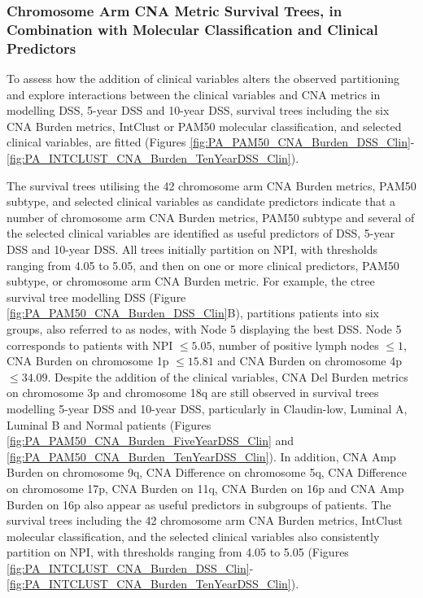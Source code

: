 \subsubsection{Chromosome Arm CNA Metric Survival Trees, in Combination with Molecular Classification and Clinical Predictors} 
To assess how the addition of clinical variables alters the observed partitioning and explore interactions between the clinical variables and CNA metrics in modelling DSS, 5-year DSS and 10-year DSS, survival trees including the six CNA Burden metrics, IntClust or PAM50 molecular classification, and selected clinical variables, are fitted (Figures \ref{fig:PA_PAM50_CNA_Burden_DSS_Clin}-\ref{fig:PA_INTCLUST_CNA_Burden_TenYearDSS_Clin}). 

The survival trees utilising the 42 chromosome arm CNA Burden metrics, PAM50 subtype, and selected clinical variables as candidate predictors indicate that a number of chromosome arm CNA Burden metrics, PAM50 subtype and several of the selected clinical variables are identified as useful predictors of DSS, 5-year DSS and 10-year DSS. All trees initially partition on NPI, with thresholds ranging from 4.05 to 5.05, and then on one or more clinical predictors, PAM50 subtype, or chromosome arm CNA Burden metric. For example, the ctree survival tree modelling DSS (Figure \ref{fig:PA_PAM50_CNA_Burden_DSS_Clin}B), partitions patients into six groups, also referred to as nodes, with Node 5 displaying the best DSS. Node 5 corresponds to patients with NPI $\leq 5.05$, number of positive lymph nodes $\leq 1$, CNA Burden on chromosome 1p $\leq 15.81$ and CNA Burden on chromosome 4p $\leq 34.09$. Despite the addition of the clinical variables, CNA Del Burden metrics on chromosome 3p and chromosome 18q are still observed in survival trees modelling 5-year DSS and 10-year DSS, particularly in Claudin-low, Luminal A, Luminal B and Normal patients (Figures \ref{fig:PA_PAM50_CNA_Burden_FiveYearDSS_Clin} and \ref{fig:PA_PAM50_CNA_Burden_TenYearDSS_Clin}). In addition, CNA Amp Burden on chromosome 9q, CNA Difference on chromosome 5q, CNA Difference on chromosome 17p, CNA Burden on 11q, CNA Burden on 16p and CNA Amp Burden on 16p also appear as useful predictors in subgroups of patients. The survival trees including the 42 chromosome arm CNA Burden metrics, IntClust molecular classification, and the selected clinical variables also consistently partition on NPI, with thresholds ranging from 4.05 to 5.05 (Figures \ref{fig:PA_INTCLUST_CNA_Burden_DSS_Clin}-\ref{fig:PA_INTCLUST_CNA_Burden_TenYearDSS_Clin}). 

